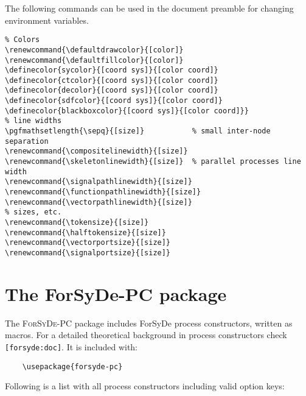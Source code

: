 \documentclass[10pt]{article}
\begin{document}
The following commands can be used in the document preamble for changing environment variables.
\begin{verbatim}
% Colors
\renewcommand{\defaultdrawcolor}{[color]}
\renewcommand{\defaultfillcolor}{[color]}
\definecolor{sycolor}{[coord sys]}{[color coord]}
\definecolor{ctcolor}{[coord sys]}{[color coord]}
\definecolor{decolor}{[coord sys]}{[color coord]}
\definecolor{sdfcolor}{[coord sys]}{[color coord]}
\definecolor{blackboxcolor}{[coord sys]}{[color coord]}}
% line widths
\pgfmathsetlength{\sepq}{[size]}           % small inter-node separation 
\renewcommand{\compositelinewidth}{[size]}
\renewcommand{\skeletonlinewidth}{[size]}  % parallel processes line width
\renewcommand{\signalpathlinewidth}{[size]}
\renewcommand{\functionpathlinewidth}{[size]}
\renewcommand{\vectorpathlinewidth}{[size]}
% sizes, etc.
\renewcommand{\tokensize}{[size]}
\renewcommand{\halftokensize}{[size]}
\renewcommand{\vectorportsize}{[size]}
\renewcommand{\signalportsize}{[size]}
\end{verbatim}

\section{The ForSyDe-PC package}

The \textsc{ForSyDe-PC} package includes ForSyDe process constructors, written as macros. For a detailed theoretical background in process constructors check \texttt{[forsyde:doc]}. It is included with: 

\begin{verbatim}
	\usepackage{forsyde-pc}
\end{verbatim}

Following is a list with all process constructors including valid option keys:
\end{document}
